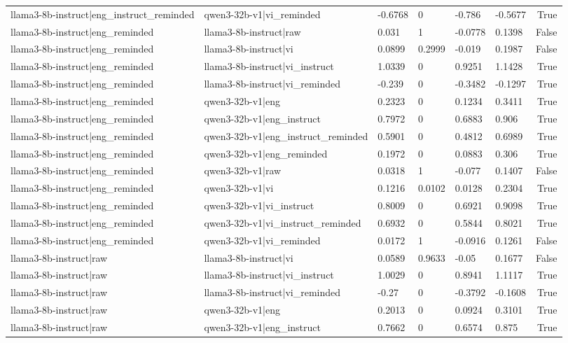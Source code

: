 \begin{table}
\begin{tabular}{llllllr}
llama3-8b-instruct|eng_instruct_reminded & qwen3-32b-v1|vi_reminded & -0.6768 & 0 & -0.786 & -0.5677 & True \\
llama3-8b-instruct|eng_reminded & llama3-8b-instruct|raw & 0.031 & 1 & -0.0778 & 0.1398 & False \\
llama3-8b-instruct|eng_reminded & llama3-8b-instruct|vi & 0.0899 & 0.2999 & -0.019 & 0.1987 & False \\
llama3-8b-instruct|eng_reminded & llama3-8b-instruct|vi_instruct & 1.0339 & 0 & 0.9251 & 1.1428 & True \\
llama3-8b-instruct|eng_reminded & llama3-8b-instruct|vi_reminded & -0.239 & 0 & -0.3482 & -0.1297 & True \\
llama3-8b-instruct|eng_reminded & qwen3-32b-v1|eng & 0.2323 & 0 & 0.1234 & 0.3411 & True \\
llama3-8b-instruct|eng_reminded & qwen3-32b-v1|eng_instruct & 0.7972 & 0 & 0.6883 & 0.906 & True \\
llama3-8b-instruct|eng_reminded & qwen3-32b-v1|eng_instruct_reminded & 0.5901 & 0 & 0.4812 & 0.6989 & True \\
llama3-8b-instruct|eng_reminded & qwen3-32b-v1|eng_reminded & 0.1972 & 0 & 0.0883 & 0.306 & True \\
llama3-8b-instruct|eng_reminded & qwen3-32b-v1|raw & 0.0318 & 1 & -0.077 & 0.1407 & False \\
llama3-8b-instruct|eng_reminded & qwen3-32b-v1|vi & 0.1216 & 0.0102 & 0.0128 & 0.2304 & True \\
llama3-8b-instruct|eng_reminded & qwen3-32b-v1|vi_instruct & 0.8009 & 0 & 0.6921 & 0.9098 & True \\
llama3-8b-instruct|eng_reminded & qwen3-32b-v1|vi_instruct_reminded & 0.6932 & 0 & 0.5844 & 0.8021 & True \\
llama3-8b-instruct|eng_reminded & qwen3-32b-v1|vi_reminded & 0.0172 & 1 & -0.0916 & 0.1261 & False \\
llama3-8b-instruct|raw & llama3-8b-instruct|vi & 0.0589 & 0.9633 & -0.05 & 0.1677 & False \\
llama3-8b-instruct|raw & llama3-8b-instruct|vi_instruct & 1.0029 & 0 & 0.8941 & 1.1117 & True \\
llama3-8b-instruct|raw & llama3-8b-instruct|vi_reminded & -0.27 & 0 & -0.3792 & -0.1608 & True \\
llama3-8b-instruct|raw & qwen3-32b-v1|eng & 0.2013 & 0 & 0.0924 & 0.3101 & True \\
llama3-8b-instruct|raw & qwen3-32b-v1|eng_instruct & 0.7662 & 0 & 0.6574 & 0.875 & True \\

\end{tabular}
\end{table}
